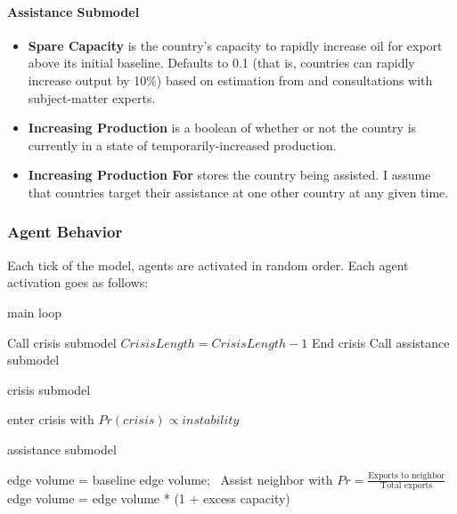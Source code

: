 \documentclass{llncs}
\begin{document}
\paragraph{Assistance Submodel}
\begin{itemize}
	\item \textbf{Spare Capacity} is the country's capacity to rapidly increase oil for export above its initial baseline. Defaults to 0.1 (that is, countries can rapidly increase output by 10\%) based on estimation from \cite{mearns_2012,eia_opec} and  consultations with subject-matter experts. 
	\item \textbf{Increasing Production} is a boolean of whether or not the country is currently in a state of temporarily-increased production.
	\item \textbf{Increasing Production For} stores the country being assisted. I assume that countries target their assistance at one other country at any given time.
	
\end{itemize}

\subsubsection{Agent Behavior}

Each tick of the model, agents are activated in random order. Each agent activation goes as follows:

\begin{algorithm}[H]
	\caption{main loop}
	 {
			Call crisis submodel \;
		}{
			$Crisis Length = Crisis Length - 1$ \;
			 { End crisis \; }
		}
	 {
		Call assistance submodel \;
	}	
\end{algorithm}

\begin{algorithm}[H]
	\caption{crisis submodel}
		enter crisis with $Pr(crisis) \propto instability$ \;
\end{algorithm}


\begin{algorithm}[H]
	\caption{assistance submodel}
	 {
			 {
				 {
					edge volume = baseline edge volume;\
				}
			}
		} {
			 {
				 {
					Assist neighbor with $Pr = \frac{\text{Exports to neighbor}}{\text{Total exports}}$
				}
			}
			 {
				 {
					edge volume = edge volume * (1 + excess capacity)\;
				}
			}
		}

\end{algorithm}
\end{document}
